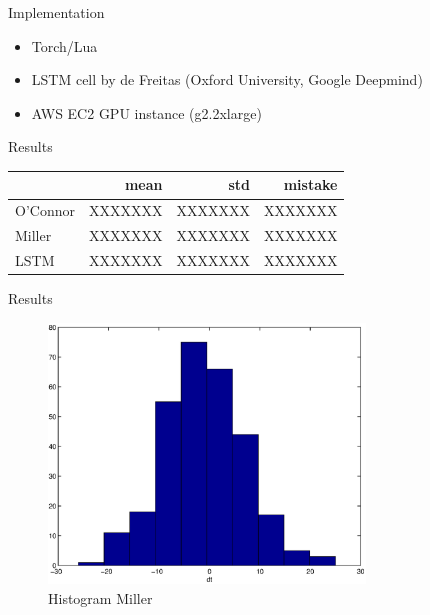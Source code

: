 \documentclass{beamer}
\newcommand{\ra}[1]{\renewcommand{\arraystretch}{#1}}
\begin{document}
\begin{frame}{Implementation}
    \begin{itemize}
        \item Torch/Lua
        \item LSTM cell by de Freitas (Oxford University, Google Deepmind)
        \item AWS EC2 GPU instance (g2.2xlarge)
    \end{itemize}
\end{frame}

\begin{frame}{Results}
    \begin{table}[H]
        \begin{center}
        \ra{1.2}
        \begin{tabular}{@{} lrrr @{}}
        \toprule
        {} & mean & std & mistake \\
        \midrule
        O'Connor  &     XXXXXXX &    XXXXXXX &    XXXXXXX \\
        Miller    &     XXXXXXX &    XXXXXXX &    XXXXXXX \\
        LSTM      &     XXXXXXX &    XXXXXXX &    XXXXXXX \\
        \bottomrule
        \end{tabular}
        \end{center}
    \end{table}
\end{frame}

\begin{frame}{Results}
    \begin{figure}
    \begin{center}
        \includegraphics[width=0.75\textwidth]{figures/hist_miller.eps}
        \caption{Histogram Miller}
        \label{fig:hist_miller}
    \end{center}
    \end{figure}
\end{frame}
\end{document}
